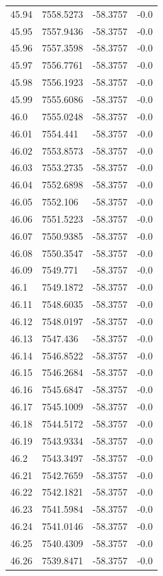 \begin{table}[H]
\begin{tabular}{llll}
45.94 & 7558.5273 & -58.3757 & -0.0 \\
45.95 & 7557.9436 & -58.3757 & -0.0 \\
45.96 & 7557.3598 & -58.3757 & -0.0 \\
45.97 & 7556.7761 & -58.3757 & -0.0 \\
45.98 & 7556.1923 & -58.3757 & -0.0 \\
45.99 & 7555.6086 & -58.3757 & -0.0 \\
46.0 & 7555.0248 & -58.3757 & -0.0 \\
46.01 & 7554.441 & -58.3757 & -0.0 \\
46.02 & 7553.8573 & -58.3757 & -0.0 \\
46.03 & 7553.2735 & -58.3757 & -0.0 \\
46.04 & 7552.6898 & -58.3757 & -0.0 \\
46.05 & 7552.106 & -58.3757 & -0.0 \\
46.06 & 7551.5223 & -58.3757 & -0.0 \\
46.07 & 7550.9385 & -58.3757 & -0.0 \\
46.08 & 7550.3547 & -58.3757 & -0.0 \\
46.09 & 7549.771 & -58.3757 & -0.0 \\
46.1 & 7549.1872 & -58.3757 & -0.0 \\
46.11 & 7548.6035 & -58.3757 & -0.0 \\
46.12 & 7548.0197 & -58.3757 & -0.0 \\
46.13 & 7547.436 & -58.3757 & -0.0 \\
46.14 & 7546.8522 & -58.3757 & -0.0 \\
46.15 & 7546.2684 & -58.3757 & -0.0 \\
46.16 & 7545.6847 & -58.3757 & -0.0 \\
46.17 & 7545.1009 & -58.3757 & -0.0 \\
46.18 & 7544.5172 & -58.3757 & -0.0 \\
46.19 & 7543.9334 & -58.3757 & -0.0 \\
46.2 & 7543.3497 & -58.3757 & -0.0 \\
46.21 & 7542.7659 & -58.3757 & -0.0 \\
46.22 & 7542.1821 & -58.3757 & -0.0 \\
46.23 & 7541.5984 & -58.3757 & -0.0 \\
46.24 & 7541.0146 & -58.3757 & -0.0 \\
46.25 & 7540.4309 & -58.3757 & -0.0 \\
46.26 & 7539.8471 & -58.3757 & -0.0 \\

\end{tabular}
\end{table}
